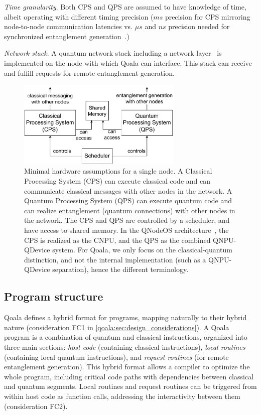 \textit{Time granularity}. Both CPS and QPS are assumed to have knowledge of time, albeit operating with different timing precision ($ms$ precision for CPS mirroring node-to-node communication latencies vs. $\mu s$ and $ns$ precision needed for synchronized entanglement generation~\cite{pompili2022experimental, dahlberg2019link}.)

 \textit{Network stack}. A quantum network stack including a network layer~\cite{dahlberg2019link} is implemented on the node with which Qoala can interface. This stack can receive and fulfill requests for remote entanglement generation.
\begin{figure}
    \centering
    \includegraphics[width=0.7\textwidth]{figures/qoala/minimal-hardware.pdf}
    \caption{Minimal hardware assumptions for a single node.
    A Classical Processing System (CPS) can execute classical code and can communicate classical messages with other nodes in the network.
    A Quantum Processing System (QPS) can execute quantum code and can realize entanglement (quantum connections) with other nodes in the network.
    The CPS and QPS are controlled by a scheduler, and have access to shared memory.
    In the QNodeOS architecture~\cite{qnodeos_nature}, the CPS is realized as the CNPU, and the QPS as the combined QNPU-QDevice system.
    For Qoala, we only focus on the classical-quantum distinction, and not the internal implementation (such as a QNPU-QDevice separation), hence the different terminology.
    }
    \label{qoala:fig:minimal_hardware_assumptions}
\end{figure}



\subsection{Program structure}
\label{qoala:sec:program_structure}
Qoala defines a hybrid format for programs, mapping naturally to their hybrid nature (consideration FC1 in \cref{qoala:sec:design_considerations}).
A Qoala program is a combination of quantum and classical instructions, 
organized into three main sections: \textit{host code} (containing classical instructions), \textit{local routines} (containing local quantum instructions), 
and \textit{request routines} (for remote entanglement generation).
This hybrid format allows a compiler to optimize the whole program, including critical code paths with dependencies between classical and quantum segments.
Local routines and request routines can be triggered from within host code as function calls, addressing the interactivity between them (consideration FC2).

